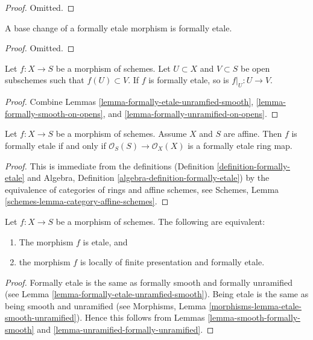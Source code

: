 \begin{proof}
Omitted.
\end{proof}

\begin{lemma}
\label{lemma-base-change-formally-etale}
A base change of a formally etale morphism is formally etale.
\end{lemma}

\begin{proof}
Omitted.
\end{proof}

\begin{lemma}
\label{lemma-formally-etale-on-opens}
Let $f : X \to S$ be a morphism of schemes.
Let $U \subset X$ and $V \subset S$ be open subschemes such that
$f(U) \subset V$. If $f$ is formally etale, so is $f|_U : U \to V$.
\end{lemma}

\begin{proof}
Combine Lemmas \ref{lemma-formally-etale-unramfied-smooth},
\ref{lemma-formally-smooth-on-opens}, and
\ref{lemma-formally-unramified-on-opens}.
\end{proof}

\begin{lemma}
\label{lemma-affine-formally-etale}
Let $f : X \to S$ be a morphism of schemes.
Assume $X$ and $S$ are affine.
Then $f$ is formally etale if and only if
$\mathcal{O}_S(S) \to \mathcal{O}_X(X)$ is a formally etale
ring map.
\end{lemma}

\begin{proof}
This is immediate from the definitions
(Definition \ref{definition-formally-etale} and
Algebra, Definition \ref{algebra-definition-formally-etale})
by the equivalence of categories of rings and affine schemes,
see
Schemes, Lemma \ref{schemes-lemma-category-affine-schemes}.
\end{proof}

\begin{lemma}
\label{lemma-etale-formally-etale}
Let $f : X \to S$ be a morphism of schemes.
The following are equivalent:
\begin{enumerate}
\item The morphism $f$ is etale, and
\item the morphism $f$ is locally of finite presentation and
formally etale.
\end{enumerate}
\end{lemma}

\begin{proof}
Formally etale is the same as formally smooth and formally unramified
(see Lemma \ref{lemma-formally-etale-unramfied-smooth}).
Being etale is the same as being smooth and unramified
(see Morphisms, Lemma \ref{morphisms-lemma-etale-smooth-unramified}).
Hence this follows from Lemmas \ref{lemma-smooth-formally-smooth}
and \ref{lemma-unramified-formally-unramified}.
\end{proof}












